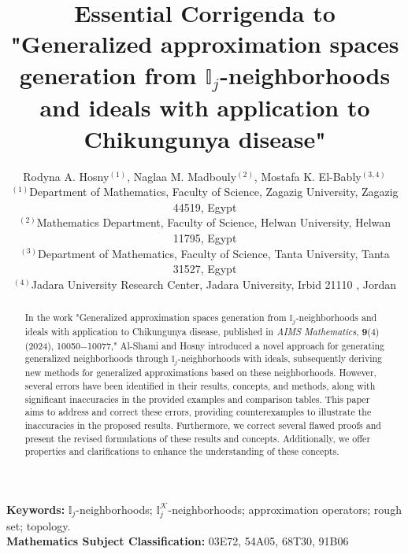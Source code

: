 \documentclass{article}
\theoremstyle{theorem}
\theoremstyle{definition}
\theoremstyle{remark}
\begin{document}
\title{\textbf{Essential Corrigenda to "Generalized approximation spaces generation from $\mathbb{I}_{j}$-neighborhoods and
ideals with application to Chikungunya disease"}}
\author{Rodyna A. Hosny$^{(1)}$, Naglaa M. Madbouly$^{(2)}$, Mostafa K. El-Bably$^{(3, 4)}$ \\
$^{(1)}${\footnotesize {Department of Mathematics, Faculty of Science,
Zagazig University, Zagazig 44519, Egypt}}\\
$^{(2)}${\footnotesize{Mathematics Department, Faculty of Science, Helwan University, Helwan 11795, Egypt}}\\
$^{(3)}${\footnotesize {Department of Mathematics, Faculty of Science, Tanta
University, Tanta 31527, Egypt}}\\
$^{(4)}${\footnotesize{Jadara University Research Center, Jadara University, Irbid 21110 , Jordan}}}
\date{}
\maketitle

\begin{abstract}
In the work "Generalized approximation spaces generation from $\mathbb{I}_{j}$-neighborhoods and ideals with application to Chikungunya disease, published in \emph{AIMS Mathematics},  \textbf{9}(4) (2024), 10050$-$10077," Al-Shami and Hosny introduced a novel approach for generating generalized neighborhoods through $\mathbb{I}_{j}$-neighborhoods with ideals, subsequently deriving new methods for generalized approximations based on these neighborhoods. However, several errors have been identified in their results, concepts, and methods, along with significant inaccuracies in the provided examples and comparison tables. This paper aims to address and correct these errors, providing counterexamples to illustrate the inaccuracies in the proposed results.  Furthermore, we correct several flawed proofs and present the revised formulations of these results and concepts. Additionally, we offer properties and clarifications to enhance the understanding of these concepts.
\color{black}
\end{abstract}

\textbf{ Keywords:} $\mathbb{I}_{j}$-neighborhoods; $\mathbb{I}^{\mathcal{K}}_{j}$-neighborhoods; approximation operators; rough set; topology.\\

\textbf{Mathematics Subject Classification:} 03E72, 54A05, 68T30, 91B06\\
\end{document}
